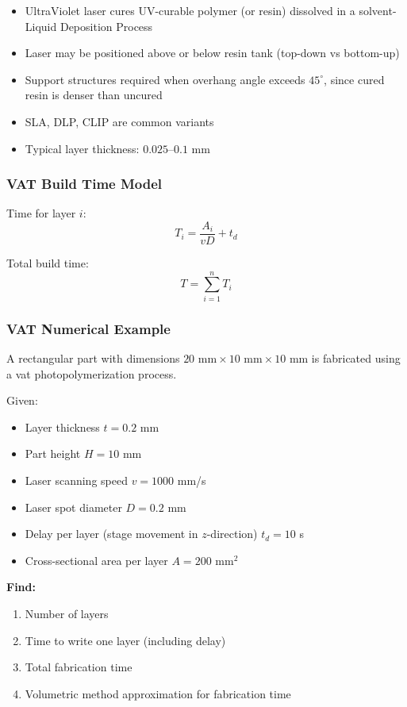 \documentclass{article}
\begin{document}
\begin{itemize}
    \item UltraViolet laser cures UV-curable polymer (or resin) dissolved in a solvent- Liquid Deposition Process
    \item Laser may be positioned above or below resin tank (top-down vs bottom-up)
    \item Support structures required when overhang angle exceeds $45^\circ$, since cured resin is denser than uncured
    \item SLA, DLP, CLIP are common variants
    \item Typical layer thickness: $0.025$–$0.1$ mm
\end{itemize}

\subsubsection{VAT Build Time Model}

Time for layer $i$:
\[
T_i = \frac{A_i}{vD} + t_d
\]

Total build time:
\[
T = \sum_{i=1}^{n} T_i
\]

\subsubsection{VAT Numerical Example}
A rectangular part with dimensions $20 \text{ mm} \times 10 \text{ mm} \times 10 \text{ mm}$ is fabricated using a vat photopolymerization process.

Given:
\begin{itemize}
    \item Layer thickness $t = 0.2$ mm
    \item Part height $H = 10$ mm
    \item Laser scanning speed $v = 1000$ mm/s
    \item Laser spot diameter $D = 0.2$ mm
    \item Delay per layer (stage movement in $z$-direction) $t_d = 10$ s
    \item Cross-sectional area per layer $A = 200$ mm$^2$
\end{itemize}

\textbf{Find:}
\begin{enumerate}
    \item Number of layers
    \item Time to write one layer (including delay)
    \item Total fabrication time
    \item Volumetric method approximation for fabrication time
\end{enumerate}
\end{document}
